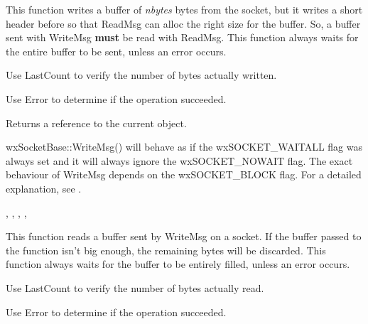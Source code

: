 %
%
\label{wxsocketbasewritemsg}


This function writes a buffer of {\it nbytes} bytes from the socket, but it
writes a short header before so that ReadMsg can alloc the right size for
the buffer. So, a buffer sent with WriteMsg {\bf must} be read with ReadMsg.
This function always waits for the entire buffer to be sent, unless an
error occurs.

Use LastCount to verify the number of bytes actually written.

Use Error to determine if the operation succeeded.





Returns a reference to the current object.


wxSocketBase::WriteMsg() will behave as if the wxSOCKET\_WAITALL flag was always set
and it will always ignore the wxSOCKET\_NOWAIT flag. The exact behaviour of WriteMsg
depends on the wxSOCKET\_BLOCK flag. For a detailed explanation, see .


, 
, 
, 
, 

%
%
\label{wxsocketbasereadmsg}


This function reads a buffer sent by WriteMsg on a socket. If the buffer passed
to the function isn't big enough, the remaining bytes will be discarded. This
function always waits for the buffer to be entirely filled, unless an error occurs.

Use LastCount to verify the number of bytes actually read.

Use Error to determine if the operation succeeded.

